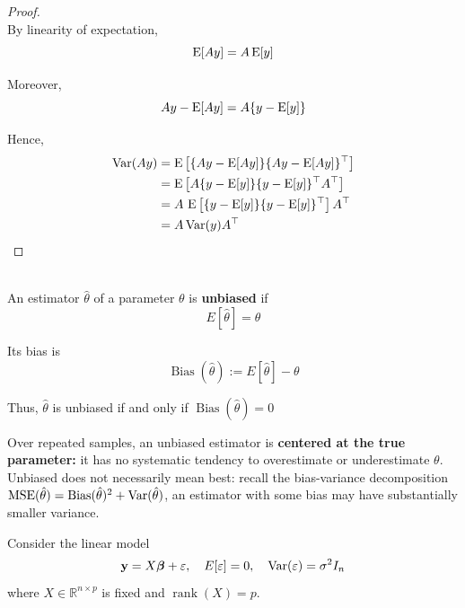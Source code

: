 \begin{proof}\leavevmode\\
    By linearity of expectation,
    \begin{equation*}
        \operatorname{E}[Ay] = A\operatorname{E}[y]
    \end{equation*}

    Moreover,
    \begin{equation*}
        Ay - \operatorname{E}[Ay] = A\{y-\operatorname{E}[y]\}
    \end{equation*}

    Hence,
    \begin{align*}
        \operatorname{Var}(Ay) &= \operatorname{E}\big[\{Ay-\operatorname{E}[Ay]\}\{Ay-\operatorname{E}[Ay]\}^\top\big] \\
        &= \operatorname{E}\big[A\{y-\operatorname{E}[y]\}\{y-\operatorname{E}[y]\}^\top A^\top\big] \\
        &= A\,\operatorname{E}\big[\{y-\operatorname{E}[y]\}\{y-\operatorname{E}[y]\}^\top\big]\,A^\top \\
        &= A\operatorname{Var}(y)A^\top
    \end{align*}
\end{proof}

\begin{definition}
\leavevmode\\
    An estimator $\hat{\theta}$ of a parameter $\theta$ is \textbf{unbiased} if
    \begin{equation*}
        E[\hat{\theta}]=\theta
    \end{equation*}

    Its bias is
    \begin{equation*}
        \operatorname{Bias}(\hat\theta):=E[\hat\theta] - \theta
    \end{equation*}

    Thus, $\hat\theta$ is unbiased if and only if $\operatorname{Bias}(\hat\theta)=0$
\end{definition}
Over repeated samples, an unbiased estimator is \textbf{centered at the true parameter:} it has no systematic tendency to overestimate or underestimate $\theta$. Unbiased does not necessarily mean best: recall the bias-variance decomposition $\operatorname{MSE}(\hat\theta)=\operatorname{Bias}(\hat\theta)^2+\operatorname{Var}(\hat\theta)$, an estimator with some bias may have substantially smaller variance.

Consider the linear model
\begin{equation*}
    \mathbf{y} = X\bm\beta + \varepsilon, \quad E[\varepsilon]=0, \quad \operatorname{Var}(\varepsilon)=\sigma^2I_n
\end{equation*}
where $X \in \mathbb{R}^{n \times p}$ is fixed and $\operatorname{rank}(X)=p$.

